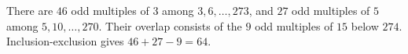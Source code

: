 There are $46$ odd multiples of $3$ among $3,6,\ldots,273$, and $27$ odd multiples of $5$ among $5,10,\ldots,270$. Their overlap consists of the $9$ odd multiples of $15$ below $274$. Inclusion-exclusion gives $46+27-9=\boxed{64}$.
